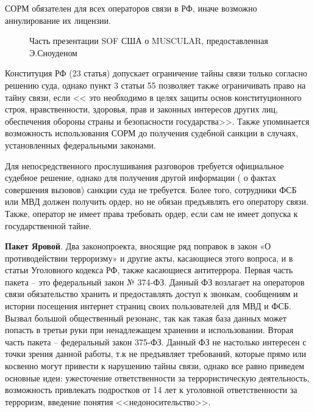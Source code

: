 	СОРМ обязателен для всех операторов связи в РФ, иначе возможно аннулирование их лицензии. \cite{SORM1} %
		\begin{figure*}[h!]
		\caption{ Часть презентации SOF США о MUSCULAR, предоставленная Э.Сноуденом}
	\end{figure*} 
	
	Конституция РФ (23 статья) допускает ограничение тайны связи только согласно решению суда, однако пункт 3 статьи 55 позволяет также ограничивать право на тайну связи, если << это необходимо в целях защиты основ конституционного строя, нравственности, здоровья, прав и законных интересов других лиц, обеспечения обороны страны и безопасности государства>>. Также упоминается возможность использования СОРМ до получения судебной санкции в случаях, установленных федеральными законами. \cite{SORM2} %
	
	Для непосредственного прослушивания разговоров требуется официальное судебное решение, однако для получения другой информации (  о фактах совершения вызовов) санкции суда не требуется. Более того, сотрудники ФСБ или МВД должен получить ордер, но не обязан предъявлять его оператору связи. Также, оператор не имеет права требовать ордер, если сам не имеет допуска к государственной тайне. 
	
	\textbf{Пакет Яровой}. Два законопроекта, вносящие ряд поправок в закон «О противодействии терроризму» и другие акты, касающиеся этого вопроса, и в статьи Уголовного кодекса РФ, также касающиеся антитеррора. Первая часть пакета -- это федеральный 	закон № 374-ФЗ. Данный ФЗ возлагает на операторов связи обязательство хранить и предоставлять доступ к звонкам, сообщениям и истории посещения интернет страниц своих пользователей для МВД и ФСБ. Вызвал большой общественный резонанс, так как такая база данных может попасть в третьи руки при ненадлежащем хранении и использовании. Вторая часть пакета -- федеральный закон 375-ФЗ. Данный ФЗ не настолько интересен с точки зрения данной работы, т.к не предъявляет требований, которые прямо или косвенно могут привести к нарушению тайны связи, однако все равно приведем основные идеи: ужесточение ответственности за террористическую деятельность, возможность привлекать подростков от 14 лет к уголовной ответственности за терроризм, введение понятия <<недоносительство>>.  
	
